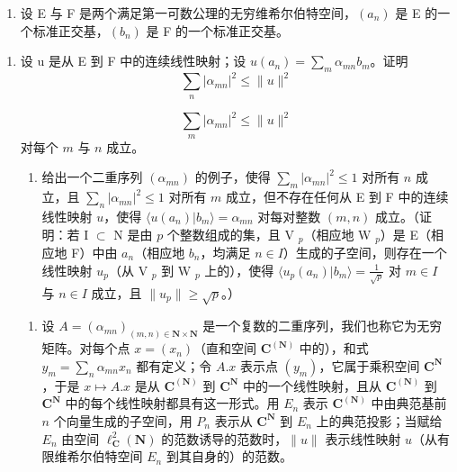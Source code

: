 \exercisegroup

\begin{enumerate}
\def\labelenumi{\arabic{enumi})}
\tightlist
\item
  设 E 与 F 是两个满足第一可数公理的无穷维希尔伯特空间，\((a_{n})\) 是 E 的一个标准正交基，\((b_{n})\) 是 F 的一个标准正交基。
\end{enumerate}

\begin{enumerate}
\def\labelenumi{\alph{enumi})}
\tightlist
\item
  设 u 是从 E 到 F 中的连续线性映射；设 \(u(a_{n}) = \sum_{m} \alpha_{mn} b_{m}\)。证明
\[
\sum_ {n} | \alpha_ {m n} | ^ {2} \leqslant \| u \| ^ {2}
\]

\[
\sum_ {m} | \alpha_ {m n} | ^ {2} \leqslant \| u \| ^ {2}
\]
对每个 \(m\) 与 \(n\) 成立。

\begin{enumerate}
\def\labelenumi{\alph{enumi})}
\setcounter{enumi}{1}
\tightlist
\item
  给出一个二重序列 \((\alpha_{mn})\) 的例子，使得 \(\sum_{m} |\alpha_{mn}|^{2} \leqslant 1\) 对所有 \(n\) 成立，且 \(\sum_{n} |\alpha_{mn}|^{2} \leqslant 1\) 对所有 \(m\) 成立，但不存在任何从 E 到 F 中的连续线性映射 \(u\)，使得 \(\langle u(a_n)|b_m\rangle = \alpha_{mn}\) 对每对整数 \((m, n)\) 成立。（证明：若 I \(\subset\) N 是由 \(p\) 个整数组成的集，且 V \(_p\)（相应地 W \(_p\)）是 E（相应地 F）中由 \(a_n\)（相应地 \(b_n\)，均满足 \(n \in I\)）生成的子空间，则存在一个线性映射 \(u_p\)（从 V \(_p\) 到 W \(_p\) 上的），使得 \(\langle u_p(a_n)|b_m\rangle = \frac{1}{\sqrt{p}}\) 对 \(m \in I\) 与 \(n \in I\) 成立，且 \(\|u_p\| \geqslant \sqrt{p}\)。）
\end{enumerate}

\begin{enumerate}
\def\labelenumi{\arabic{enumi})}
\setcounter{enumi}{1}
\tightlist
\item
  设 \(A = (\alpha_{mn})_{(m,n)\in \mathbf{N}\times \mathbf{N}}\) 是一个复数的二重序列，我们也称它为无穷矩阵。对每个点 \(x = (x_{n})\)（直和空间 \(\mathbf{C}^{(\mathbf{N})}\) 中的），和式 \(y_{m} = \sum_{n}\alpha_{mn}x_{n}\) 都有定义；令 \(A.x\) 表示点 \((y_{m})\)，它属于乘积空间 \(\mathbf{C}^{\mathbf{N}}\)，于是 \(x\mapsto A.x\) 是从 \(\mathbf{C}^{(\mathbf{N})}\) 到 \(\mathbf{C}^{\mathbf{N}}\) 中的一个线性映射，且从 \(\mathbf{C}^{(\mathbf{N})}\) 到 \(\mathbf{C}^{\mathbf{N}}\) 中的每个线性映射都具有这一形式。用 \(E_{n}\) 表示 \(\mathbf{C}^{(\mathbf{N})}\) 中由典范基前 \(n\) 个向量生成的子空间，用 \(P_{n}\) 表示从 \(\mathbf{C}^{\mathbf{N}}\) 到 \(E_{n}\) 上的典范投影；当赋给 \(E_{n}\) 由空间 \(\ell_{\mathbf{C}}^{2}(\mathbf{N})\) 的范数诱导的范数时，\(\| u\|\) 表示线性映射 \(u\)（从有限维希尔伯特空间 \(E_{n}\) 到其自身的）的范数。
\end{enumerate}


\end{enumerate}
